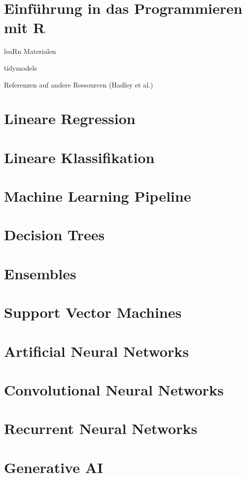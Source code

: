 \documentclass[
]{book}
\begin{document}
\hypertarget{intro-R}{%
\chapter{Einführung in das Programmieren mit R}\label{intro-R}}

leaRn Materialen

tidymodels

Referenzen auf andere Ressourcen (Hadley et al.)

\hypertarget{lin-reg}{%
\chapter{Lineare Regression}\label{lin-reg}}

\hypertarget{lin-class}{%
\chapter{Lineare Klassifikation}\label{lin-class}}

\hypertarget{ml-pipeline}{%
\chapter{Machine Learning Pipeline}\label{ml-pipeline}}

\hypertarget{trees}{%
\chapter{Decision Trees}\label{trees}}

\hypertarget{ensembles}{%
\chapter{Ensembles}\label{ensembles}}

\hypertarget{svm}{%
\chapter{Support Vector Machines}\label{svm}}

\hypertarget{ann}{%
\chapter{Artificial Neural Networks}\label{ann}}

\hypertarget{cnn}{%
\chapter{Convolutional Neural Networks}\label{cnn}}

\hypertarget{rnn}{%
\chapter{Recurrent Neural Networks}\label{rnn}}

\hypertarget{gen-AI}{%
\chapter{Generative AI}\label{gen-AI}}

  
\end{document}
